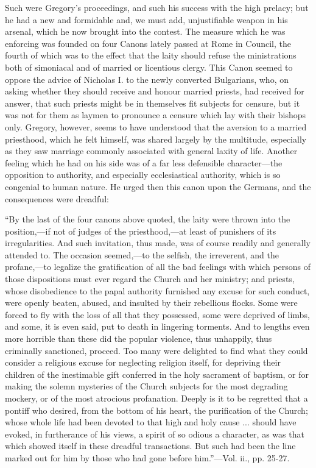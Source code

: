 Such were Gregory's proceedings, and such his
success with the high prelacy; but he had a new and formidable and, we
must add, unjustifiable weapon in his arsenal, which he now brought
into the contest. The measure which he was enforcing was founded on
four Canons lately passed at Rome in Council, the fourth of which was
to the effect that the laity should refuse the ministrations both of
simoniacal and of married or licentious clergy. This Canon seemed to
oppose the advice of Nicholas I. to the newly converted Bulgarians,
who, on asking whether they should receive and honour married priests,
had received for answer, that such priests might be in themselves fit
subjects for censure, but it was not for them as laymen to pronounce a
censure which lay with their bishops only. Gregory, however, seems to
have understood that the aversion to a married priesthood, which he
felt himself, was shared largely by the multitude, especially as they
saw marriage commonly associated with general laxity of life. Another
feeling which he had on his side was of a far less defensible
character—the opposition to authority, and especially ecclesiastical
authority, which is so congenial to human nature. He urged then this
canon upon the Germans, and the consequences were dreadful:

``By
the last of the four canons above quoted, the laity were thrown into
the position,—if not of judges of the priesthood,—at least of
punishers of its irregularities. And such invitation, thus made, was
of course readily and generally attended to. The occasion seemed,—to
the selfish, the irreverent, and the profane,—to legalize the
gratification of all the bad feelings with which persons of those
dispositions must ever regard the Church and her ministry; and
priests, whose disobedience to the papal authority furnished any
excuse for such conduct, were openly beaten, abused, and
insulted by their rebellious flocks. Some were forced to fly with the
loss of all that they possessed, some were deprived of limbs, and
some, it is even said, put to death in lingering torments. And to
lengths even more horrible than these did the popular violence, thus
unhappily, thus criminally sanctioned, proceed. Too many were
delighted to find what they could consider a religious excuse for
neglecting religion itself, for depriving their children of the
inestimable gift conferred in the holy sacrament of baptism, or for
making the solemn mysteries of the Church subjects for the most
degrading mockery, or of the most atrocious profanation. Deeply is it
to be regretted that a pontiff who desired, from the bottom of his
heart, the purification of the Church; whose whole life had been
devoted to that high and holy cause ... should have evoked, in
furtherance of his views, a spirit of so odious a character, as was
that which showed itself in these dreadful transactions. But such had
been the line marked out for him by those who had gone before him.''—Vol.
ii., pp. 25-27.

